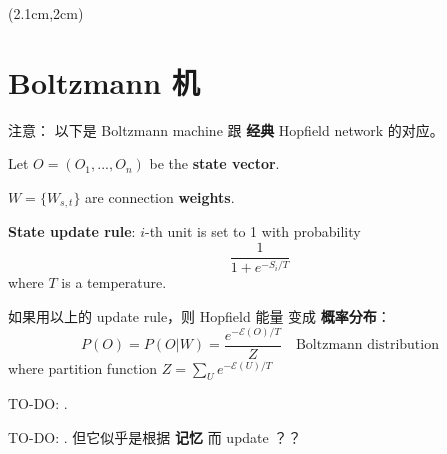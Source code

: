 \begin{preview}
\begin{minipage}{\textwidth}
\setlength{\parskip}{0.4\baselineskip}

\begin{textblock*}{20cm}(2.1cm,2cm) %
	{\color{red}{\large \textcircled{\small \themypage}}}
	\hspace{8cm}
\end{textblock*}
\addtocounter{mypage}{1}
\vspace*{0.3cm} 

\section{Boltzmann 机}

注意： 以下是 Boltzmann machine 跟 \textbf{经典} Hopfield network 的对应。

Let $O = (O_1, ..., O_n)$ be the \textbf{state vector}.

$W = \{ W_{s,t} \}$ are connection \textbf{weights}.

\textbf{State update rule}:  $i$-th unit is set to 1 with probability
\begin{equation}
\frac{1}{1 + e^{- S_i / T}}
\end{equation}
where $T$ is a temperature.

如果用以上的 update rule，则 Hopfield 能量 变成 \textbf{概率分布}：
\begin{equation}
P(O) = P(O|W) = \frac{e^{-\mathcal{E}(O)/T}}{Z} \quad \boxed{\mbox{Boltzmann distribution}}
\end{equation}
where partition function $\displaystyle Z = \sum_U e^{-\mathcal{E}(U)/T} $

{\color{red}TO-DO:} .


{\color{red}TO-DO:} .  但它似乎是根据 \textbf{记忆} 而 update ？？

\end{minipage}
\end{preview}

